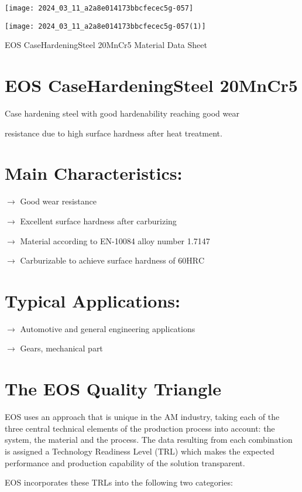 \documentclass[10pt]{article}
\begin{document}
\begin{center}
\texttt{[image: 2024\_03\_11\_a2a8e014173bbcfecec5g-057]}
\end{center}

\begin{center}
\texttt{[image: 2024\_03\_11\_a2a8e014173bbcfecec5g-057(1)]}
\end{center}

EOS CaseHardeningSteel 20MnCr5 Material Data Sheet

\section*{EOS CaseHardeningSteel 20MnCr5}
Case hardening steel with good hardenability reaching good wear

resistance due to high surface hardness after heat treatment.

\section*{Main Characteristics:}
$\longrightarrow$ Good wear resistance

$\longrightarrow$ Excellent surface hardness after carburizing

$\longrightarrow$ Material according to EN-10084 alloy number 1.7147

$\longrightarrow$ Carburizable to achieve surface hardness of $60 \mathrm{HRC}$

\section*{Typical Applications:}
$\longrightarrow$ Automotive and general engineering applications

$\longrightarrow$ Gears, mechanical part

\section*{The EOS Quality Triangle}
EOS uses an approach that is unique in the AM industry, taking each of the three central technical elements of the production process into account: the system, the material and the process. The data resulting from each combination is assigned a Technology Readiness Level (TRL) which makes the expected performance and production capability of the solution transparent.

EOS incorporates these TRLs into the following two categories:
\end{document}
